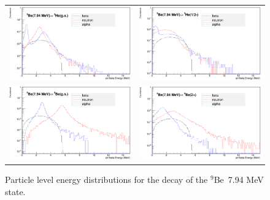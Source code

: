 \documentclass{JINST}
\newcommand{\beNINE}{$^{9}$Be~}
\begin{document}
    \begin{figure}[htp]
     \centering
       
  \begin{tabular}{cc}

    \includegraphics[width=70mm]{a_n_beta_spect_c7.eps} &
   
    \includegraphics[width=70mm]{a_n_beta_spect_c8.eps} \\

    \includegraphics[width=70mm]{a_n_beta_spect_c9.eps} &
   
    \includegraphics[width=70mm]{a_n_beta_spect_c10.eps}&

    
      \end{tabular}
  \caption{Particle level energy distributions for the decay of the \beNINE 7.94 MeV state.}
    \end{figure}
\end{document}
